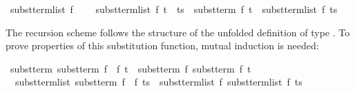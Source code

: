 \begin{isabellebody}
{}\ {}subst{}term{}list\ f\ {}{}\ {}\ {}{}{}\isanewline
{}\ {}subst{}term{}list\ f\ {}t\ {}\ ts{}\ {}\ subst{}term\ f\ t\ {}\ subst{}term{}list\ f\ ts{}%
\begin{isamarkuptext}%
The recursion scheme follows the structure of the unfolded
  definition of type .  To prove properties of this
  substitution function, mutual induction is needed:%
\end{isamarkuptext}%
\isamarkuptrue%
\isamarkupfalse%
\ {}subst{}term\ {}subst{}term\ f{}\ {}\ f{}{}\ t\ {}\ subst{}term\ f{}\ {}subst{}term\ f{}\ t{}{}\ \isanewline
\ \ {}subst{}term{}list\ {}subst{}term\ f{}\ {}\ f{}{}\ ts\ {}\ subst{}term{}list\ f{}\ {}subst{}term{}list\ f{}\ ts{}{}\isanewline

\end{isabellebody}
